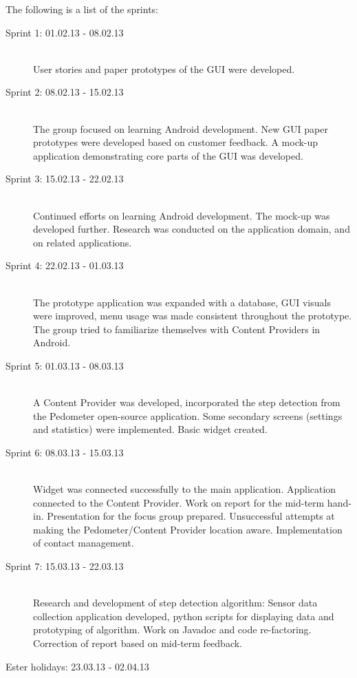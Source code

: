 The following is a list of the sprints:

\begin{description}
\item[Sprint 1: 01.02.13 - 08.02.13] \hline \hfill \\
User stories and paper prototypes of the GUI were developed.
\item[Sprint 2: 08.02.13 - 15.02.13] \hline \hfill \\
The group focused on learning Android development. New GUI paper prototypes were developed based on customer feedback. A mock-up application demonstrating core parts of the GUI was developed.
\item[Sprint 3: 15.02.13 - 22.02.13] \hline \hfill \\
Continued efforts on learning Android development. The mock-up was developed further. Research was conducted on the application domain, and on related applications. 
\item[Sprint 4: 22.02.13 - 01.03.13] \hline \hfill \\
The prototype application was expanded with a database, GUI visuals were improved, menu usage was made consistent throughout the prototype. The group tried to familiarize themselves with Content Providers in Android.
\item[Sprint 5: 01.03.13 - 08.03.13] \hline \hfill \\
A Content Provider was developed, incorporated the step detection from the Pedometer open-source application. Some secondary screens (settings and statistics) were implemented. Basic widget created.
\item[Sprint 6: 08.03.13 - 15.03.13] \hline \hfill \\
Widget was connected successfully to the main application. Application connected to the Content Provider. Work on report for the mid-term hand-in. Presentation for the focus group prepared. Unsuccessful attempts at making the Pedometer/Content Provider location aware. Implementation of contact management. 
\item[Sprint 7: 15.03.13 - 22.03.13] \hline \hfill \\
Research and development of step detection algorithm: Sensor data collection application developed, python scripts for displaying data and prototyping of algorithm. Work on Javadoc and code re-factoring. Correction of report based on mid-term feedback.
\item[Ester holidays: 23.03.13 - 02.04.13] \hline \hfill \\

\end{description}
